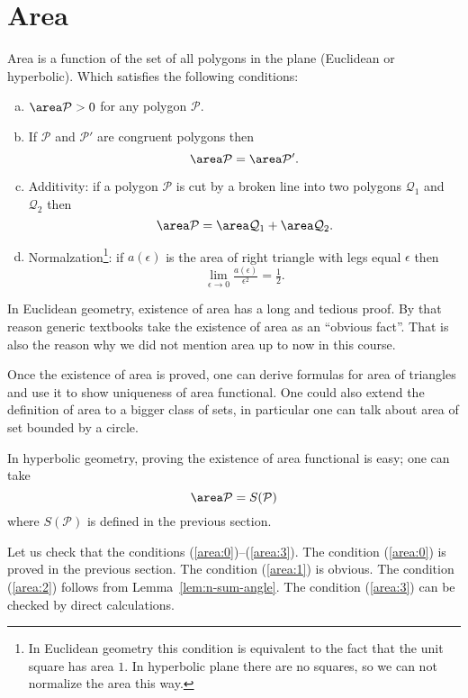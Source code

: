 \section*{Area}\label{def:area}

Area is a function of the set of all polygons in the plane (Euclidean or hyperbolic).
Which satisfies the following conditions:

\begin{enumerate}[(a)]
\item\label{area:0} $\area\mathcal P>0$ for any polygon $\mathcal P$.
\item\label{area:1} If $\mathcal P$ and $\mathcal P'$ are congruent polygons then
$$\area\mathcal P=\area\mathcal P'.$$
\item\label{area:2}  Additivity:
 if a polygon $\mathcal{P}$ is cut by a broken line into two polygons 
$\mathcal{Q}_1$ and $\mathcal{Q}_2$ then
$$\area\mathcal{P}=
\area\mathcal{Q}_1+\area\mathcal{Q}_2.$$
\item\label{area:3}  Normalzation\footnote{In Euclidean geometry this condition is equivalent to the fact that the unit square has area $1$. In hyperbolic plane there are no squares, so we can not normalize the area this way.}: if $a(\epsilon)$ is the area of right triangle with legs equal $\epsilon$ then
$$\lim_{\epsilon\to0} \tfrac{a(\epsilon)}{\epsilon^2}=\tfrac12.$$
\end{enumerate}

In Euclidean geometry, existence of area has a  long and tedious proof.
By that reason generic textbooks 
take the existence of area as an ``obvious fact''.
That is also the reason why we did not mention area up to now in this course.

Once the existence of area is proved, 
one can derive formulas for area of triangles and use it to show uniqueness of area functional.
One could also extend the definition of area to a bigger class of sets,
in particular one can talk about area of set bounded by a circle.

In hyperbolic geometry,
proving the existence of area functional is easy;
one can take 
$$\area\mathcal{P}= S(\mathcal{P})$$
where $S(\mathcal{P})$ is defined in the previous section.

Let us check that the conditions (\ref{area:0})--(\ref{area:3}).
The condition (\ref{area:0}) is proved in the previous section.
The condition (\ref{area:1}) is obvious.
The condition (\ref{area:2}) follows from Lemma~\ref{lem:n-sum-angle}.
The condition (\ref{area:3}) can be checked by direct calculations.
\qeds


